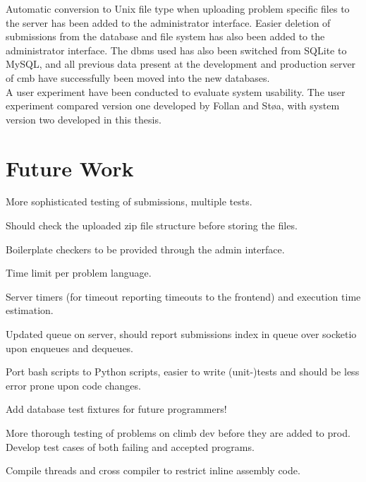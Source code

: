 Automatic conversion to Unix file type when uploading problem specific files to the server has been added to the administrator interface. Easier deletion of submissions from the database and file system has also been added to the administrator interface. The \gls{dbms} used has also been switched from SQLite to MySQL, and all previous data present at the development and production server of \gls{cmb} have successfully been moved into the new databases. \\

A user experiment have been conducted to evaluate system usability. The user experiment compared version one developed by Follan and Støa, with system version two developed in this thesis.

\section{Future Work}
\label{sec:future-work}

More sophisticated testing of submissions, multiple tests.

Should check the uploaded zip file structure before storing the files.

Boilerplate checkers to be provided through the admin interface.

Time limit per problem language.

Server timers (for timeout reporting timeouts to the frontend) and execution time estimation.

Updated queue on server, should report submissions index in queue over socketio upon enqueues and dequeues.

Port bash scripts to Python scripts, easier to write (unit-)tests and should be less error prone upon code changes.

Add database test fixtures for future programmers!

More thorough testing of problems on climb dev before they are added to prod. Develop test cases of both failing and accepted programs.

Compile threads and cross compiler to restrict inline assembly code.
